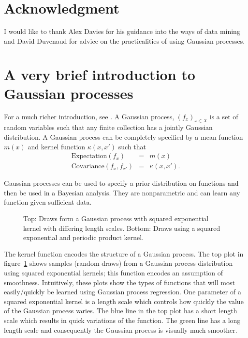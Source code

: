 \documentclass[preprint,authoryear,12pt]{elsarticle}
\begin{document}
\section*{Acknowledgment}

I would like to thank Alex Davies for his guidance into the ways of data mining and David Duvenaud for advice on the practicalities of using Gaussian processes.

\appendix

\section{A very brief introduction to Gaussian processes}

For a much richer introduction, see \cite{Rasmussen2006}.
A Gaussian process, $(f_x)_{x \in X}$ is a set of random variables such that any finite collection has a jointly Gaussian distribution.
A Gaussian process can be completely specified by a mean function $m(x)$ and kernel function $\kappa (x, x')$ such that
\begin{eqnarray}
\text{Expectation}(f_x) & = & m(x) \\
\text{Covariance}(f_x, f_{x'}) & = & \kappa (x, x').
\end{eqnarray}

Gaussian processes can be used to specify a prior distribution on functions and then be used in a Bayesian analysis.
They are nonparametric and can learn any function given sufficient data.

\begin{figure}[ht]
  \begin{center}
    
  \end{center}
  \caption{Top: Draws form a Gaussian process with squared exponential kernel with differing length scales. Bottom: Draws using a squared exponential and periodic product kernel.}
  \label{fig:gp_samples}
\end{figure}

The kernel function encodes the structure of a Gaussian process.
The top plot in figure~\ref{fig:gp_samples} shows samples (random draws) from a Gaussian process distribution using squared exponential kernels; this function encodes an assumption of smoothness.
Intuitively, these plots show the types of functions that will most easily/quickly be learned using Gaussian process regression.
One parameter of a squared exponential kernel is a length scale which controls how quickly the value of the Gaussian process varies.
The blue line in the top plot has a short length scale which results in quick variations of the function.
The green line has a long length scale and consequently the Gaussian process is visually much smoother.
\end{document}
